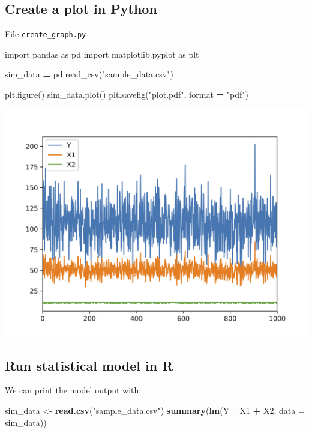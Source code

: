 \documentclass[]{book}
\newenvironment{Shaded}{\begin{snugshade}}{\end{snugshade}}
\newcommand{\KeywordTok}[1]{\textcolor[rgb]{0.13,0.29,0.53}{\textbf{#1}}}
\newcommand{\DataTypeTok}[1]{\textcolor[rgb]{0.13,0.29,0.53}{#1}}
\newcommand{\StringTok}[1]{\textcolor[rgb]{0.31,0.60,0.02}{#1}}
\newcommand{\ImportTok}[1]{#1}
\newcommand{\OperatorTok}[1]{\textcolor[rgb]{0.81,0.36,0.00}{\textbf{#1}}}
\newcommand{\BuiltInTok}[1]{#1}
\newcommand{\NormalTok}[1]{#1}
\theoremstyle{definition}
\theoremstyle{definition}
\theoremstyle{definition}
\theoremstyle{remark}
\begin{document}
\subsection{Create a plot in Python}\label{create-a-plot-in-python}

File \texttt{create\_graph.py}

\begin{Shaded}
\begin{Highlighting}[]
\ImportTok{import}\NormalTok{ pandas }\ImportTok{as}\NormalTok{ pd}
\ImportTok{import}\NormalTok{ matplotlib.pyplot }\ImportTok{as}\NormalTok{ plt}

\NormalTok{sim_data }\OperatorTok{=}\NormalTok{ pd.read_csv(}\StringTok{"sample_data.csv"}\NormalTok{)}

\NormalTok{plt.figure()}
\NormalTok{sim_data.plot()}
\NormalTok{plt.savefig(}\StringTok{"plot.pdf"}\NormalTok{, }\BuiltInTok{format} \OperatorTok{=} \StringTok{"pdf"}\NormalTok{)}
\end{Highlighting}
\end{Shaded}

\includegraphics{images/ch1_plot.jpg}

\subsection{Run statistical model in
R}\label{run-statistical-model-in-r}

We can print the model output with:

\begin{Shaded}
\begin{Highlighting}[]
\NormalTok{sim_data <-}\StringTok{ }\KeywordTok{read.csv}\NormalTok{(}\StringTok{"sample_data.csv"}\NormalTok{)}
\KeywordTok{summary}\NormalTok{(}\KeywordTok{lm}\NormalTok{(Y }\OperatorTok{~}\StringTok{ }\NormalTok{X1 }\OperatorTok{+}\StringTok{ }\NormalTok{X2, }\DataTypeTok{data =}\NormalTok{ sim_data))}
\end{Highlighting}
\end{Shaded}
\end{document}
